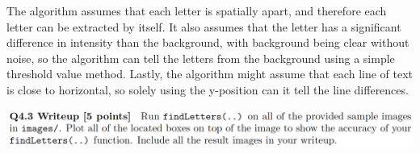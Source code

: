 \documentclass[12pt,letterpaper,boxed]{hmcpset}
\begin{document}
\begin{solution}
The algorithm assumes that each letter is spatially apart, and therefore each letter can
be extracted by itself. It also assumes that the letter has a significant difference in intensity
than the background, with background being clear without noise, so the algorithm can tell the letters from the background using a simple threshold value method. Lastly, the algorithm might assume that each line of text is close to horizontal, so solely using the y-position can it tell the line differences.
\end{solution}
\newpage

\begin{problem}[]
\includegraphics[width=\textwidth]{4_3.png}
\end{problem}
\end{document}

